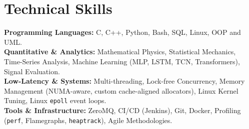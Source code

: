 \documentclass[letterpaper,10pt]{article}
\begin{document}
\section{Technical Skills}
 \begin{itemize}[leftmargin=0.15in, label={}]
    \small{\item{
     \textbf{Programming Languages:}{ C, C++, Python, Bash, SQL, Linux, OOP and UML.} \\
     \textbf{Quantitative \& Analytics:}{ Mathematical Physics, Statistical Mechanics, 
     Time-Series Analysis, Machine Learning (MLP, LSTM, TCN, Transformers), Signal Evaluation.} \\
     \textbf{Low-Latency \& Systems:}{ Multi-threading, Lock-free Concurrency, 
     Memory Management (NUMA-aware, custom cache-aligned allocators), 
     Linux Kernel Tuning, Linux \texttt{epoll} event loops.} \\
     \textbf{Tools \& Infrastructure:}{ ZeroMQ, CI/CD (Jenkins), Git, 
     Docker, Profiling (\texttt{perf}, Flamegraphs, \texttt{heaptrack}), Agile Methodologies.}
    }}
 \end{itemize}

\end{document}
